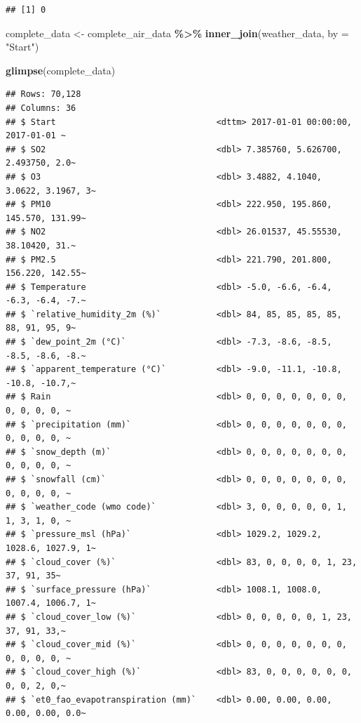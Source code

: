\documentclass[
]{article}
\newenvironment{Shaded}{\begin{snugshade}}{\end{snugshade}}
\newcommand{\AttributeTok}[1]{\textcolor[rgb]{0.13,0.29,0.53}{#1}}
\newcommand{\FunctionTok}[1]{\textcolor[rgb]{0.13,0.29,0.53}{\textbf{#1}}}
\newcommand{\NormalTok}[1]{#1}
\newcommand{\OtherTok}[1]{\textcolor[rgb]{0.56,0.35,0.01}{#1}}
\newcommand{\SpecialCharTok}[1]{\textcolor[rgb]{0.81,0.36,0.00}{\textbf{#1}}}
\newcommand{\StringTok}[1]{\textcolor[rgb]{0.31,0.60,0.02}{#1}}
\begin{document}
\begin{verbatim}
## [1] 0
\end{verbatim}

\begin{Shaded}
\begin{Highlighting}[]
\NormalTok{complete\_data }\OtherTok{\textless{}{-}}\NormalTok{ complete\_air\_data }\SpecialCharTok{\%\textgreater{}\%}
  \FunctionTok{inner\_join}\NormalTok{(weather\_data, }\AttributeTok{by =} \StringTok{"Start"}\NormalTok{)}

\FunctionTok{glimpse}\NormalTok{(complete\_data)}
\end{Highlighting}
\end{Shaded}

\begin{verbatim}
## Rows: 70,128
## Columns: 36
## $ Start                                <dttm> 2017-01-01 00:00:00, 2017-01-01 ~
## $ SO2                                  <dbl> 7.385760, 5.626700, 2.493750, 2.0~
## $ O3                                   <dbl> 3.4882, 4.1040, 3.0622, 3.1967, 3~
## $ PM10                                 <dbl> 222.950, 195.860, 145.570, 131.99~
## $ NO2                                  <dbl> 26.01537, 45.55530, 38.10420, 31.~
## $ PM2.5                                <dbl> 221.790, 201.800, 156.220, 142.55~
## $ Temperature                          <dbl> -5.0, -6.6, -6.4, -6.3, -6.4, -7.~
## $ `relative_humidity_2m (%)`           <dbl> 84, 85, 85, 85, 85, 88, 91, 95, 9~
## $ `dew_point_2m (°C)`                  <dbl> -7.3, -8.6, -8.5, -8.5, -8.6, -8.~
## $ `apparent_temperature (°C)`          <dbl> -9.0, -11.1, -10.8, -10.8, -10.7,~
## $ Rain                                 <dbl> 0, 0, 0, 0, 0, 0, 0, 0, 0, 0, 0, ~
## $ `precipitation (mm)`                 <dbl> 0, 0, 0, 0, 0, 0, 0, 0, 0, 0, 0, ~
## $ `snow_depth (m)`                     <dbl> 0, 0, 0, 0, 0, 0, 0, 0, 0, 0, 0, ~
## $ `snowfall (cm)`                      <dbl> 0, 0, 0, 0, 0, 0, 0, 0, 0, 0, 0, ~
## $ `weather_code (wmo code)`            <dbl> 3, 0, 0, 0, 0, 0, 1, 1, 3, 1, 0, ~
## $ `pressure_msl (hPa)`                 <dbl> 1029.2, 1029.2, 1028.6, 1027.9, 1~
## $ `cloud_cover (%)`                    <dbl> 83, 0, 0, 0, 0, 1, 23, 37, 91, 35~
## $ `surface_pressure (hPa)`             <dbl> 1008.1, 1008.0, 1007.4, 1006.7, 1~
## $ `cloud_cover_low (%)`                <dbl> 0, 0, 0, 0, 0, 1, 23, 37, 91, 33,~
## $ `cloud_cover_mid (%)`                <dbl> 0, 0, 0, 0, 0, 0, 0, 0, 0, 0, 0, ~
## $ `cloud_cover_high (%)`               <dbl> 83, 0, 0, 0, 0, 0, 0, 0, 0, 2, 0,~
## $ `et0_fao_evapotranspiration (mm)`    <dbl> 0.00, 0.00, 0.00, 0.00, 0.00, 0.0~

\end{verbatim}
\end{document}
